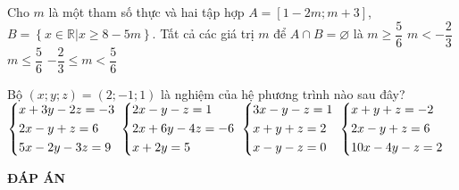 \begin{ex}%
	Cho $m$ là một tham số thực và hai tập hợp $A=\left[1-2m;m+3\right]$, $B=\left\{x\in \mathbb{R}|x\ge 8-5m\right\}$. Tất cả các giá trị $m$ để $A\cap B=\varnothing $ là
	\choice
	{$m\ge \dfrac{5}{6}$}
	{$m<-\dfrac{2}{3}$}
	{$m\le \dfrac{5}{6}$}
	{\True $-\dfrac{2}{3}\le m<\dfrac{5}{6}$}
	\loigiai{
		Ta có: $B=\left[8-5m;+\infty\right)$ nên $A\cap B=\varnothing$ khi $\heva{& 1-2m\leq m+3 \\& 8-5m>m+3\\}\Rightarrow -\dfrac{2}{3}\le m<\dfrac{5}{6}.$
	}
\end{ex}
\begin{ex}%
	Bộ $\left(x;y;z\right)=\left(2;-1;1\right)$ là nghiệm của hệ phương trình nào sau đây?
	\choice
	{\True $\left\{\begin{aligned}& x+3y-2z=-3 \\& 2x-y+z=6 \\& 5x-2y-3z=9 \\\end{aligned}\right.$}
	{$\left\{\begin{aligned}& 2x-y-z=1 \\& 2x+6y-4z=-6 \\& x+2y=5 \\\end{aligned}\right.$}
	{$\left\{\begin{aligned}& 3x-y-z=1 \\& x+y+z=2 \\& x-y-z=0 \\\end{aligned}\right.$}
	{$\left\{\begin{aligned}& x+y+z=-2 \\& 2x-y+z=6 \\& 10x-4y-z=2 \\\end{aligned}\right.$}
\end{ex}
\newpage
\begin{center}
	\textbf{ĐÁP ÁN}
\end{center}
\begin{multicols}{10}
	 
\end{multicols}